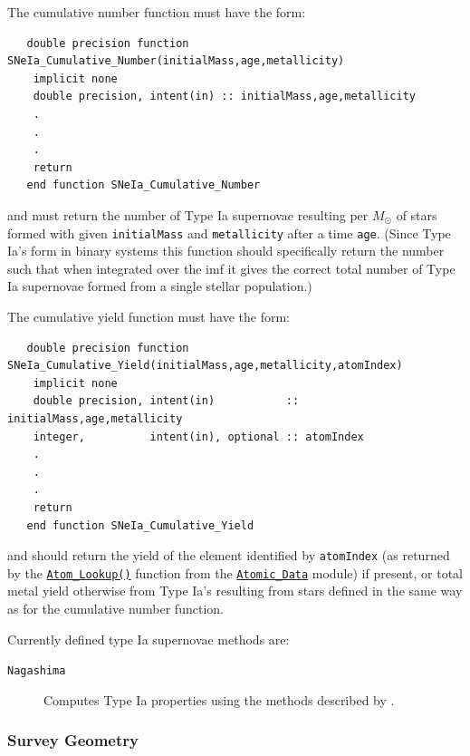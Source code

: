 The cumulative number function must have the form:
\begin{verbatim}
   double precision function SNeIa_Cumulative_Number(initialMass,age,metallicity)
    implicit none
    double precision, intent(in) :: initialMass,age,metallicity
    .
    .
    .
    return
   end function SNeIa_Cumulative_Number 
\end{verbatim}
and must return the number of Type Ia supernovae resulting per $M_\odot$ of stars formed with given {\tt initialMass} and {\tt metallicity} after a time {\tt age}. (Since Type Ia's form in binary systems this function should specifically return the number such that when integrated over the \gls{imf} it gives the correct total number of Type Ia supernovae formed from a single stellar population.)

The cumulative yield function must have the form:
\begin{verbatim}
   double precision function SNeIa_Cumulative_Yield(initialMass,age,metallicity,atomIndex)
    implicit none
    double precision, intent(in)           :: initialMass,age,metallicity
    integer,          intent(in), optional :: atomIndex
    .
    .
    .
    return
   end function SNeIa_Cumulative_Yield 
\end{verbatim}
and should return the yield of the element identified by {\tt atomIndex} (as returned by the \hyperlink{atomic.data.F90:atomic_data:atom_lookup}{{\tt Atom\_Lookup()}} function from the \hyperlink{atomic.data.F90:atomic_data}{{\tt Atomic\_Data}} module) if present, or total metal yield otherwise from Type Ia's resulting from stars defined in the same way as for the cumulative number function.

Currently defined type Ia supernovae methods are:
\begin{description}
 \item [{\tt Nagashima}] Computes Type Ia properties using the methods described by \cite{nagashima_metal_2005}.
\end{description}

\subsubsection{Survey Geometry}

